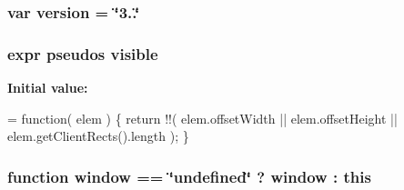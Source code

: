 \subsubsection[{\texorpdfstring{version}{version}}]{\setlength{\rightskip}{0pt plus 5cm}var version = \char`\"{}3..\char`\"{}}\hypertarget{jquery-3_82_81_8js_a614229fff4211edebc3c193d1e7763ec}{}\label{jquery-3_82_81_8js_a614229fff4211edebc3c193d1e7763ec}
\subsubsection[{\texorpdfstring{visible}{visible}}]{ {\bf expr} pseudos visible}\hypertarget{jquery-3_82_81_8js_ad2847a0ef6a0103600626ff918a856ca}{}\label{jquery-3_82_81_8js_ad2847a0ef6a0103600626ff918a856ca}
{\bfseries Initial value\+:}
\begin{DoxyCode}
= \textcolor{keyword}{function}( elem ) \{
    \textcolor{keywordflow}{return} !!( elem.offsetWidth || elem.offsetHeight || elem.getClientRects().length );
\}
\end{DoxyCode}
\subsubsection[{\texorpdfstring{window}{window}}]{\setlength{\rightskip}{0pt plus 5cm}function window == \char`\"{}undefined\char`\"{} ? window \+: this}\hypertarget{jquery-3_82_81_8js_ad55530ae1e5978df8e721017c1fc8466}{}\label{jquery-3_82_81_8js_ad55530ae1e5978df8e721017c1fc8466}
